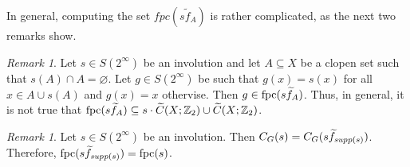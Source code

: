 \documentclass[11pt]{amsart}
\newcommand{\suppg}{{\it supp}}
\newcommand{\fpc}{{\rm fpc}}
\theoremstyle{plain}
\theoremstyle{definition}
\theoremstyle{remark}
\newtheorem{remark}[theorem]{Remark}
\numberwithin{equation}{section}
\begin{document}
In general, computing the set $fpc(s\widetilde f_A)$ is rather complicated, as the next two remarks show.
\begin{remark}\label{rem: fpc s widetilde f_A}
	Let $s\in S(2^\infty)$ be an involution and let $A\subseteq X$ be a clopen set such that $s(A)\cap A=\varnothing$. Let $g\in S(2^\infty)$ be such that $g(x)=s(x)$ for all $x\in A\cup s(A)$ and $g(x)=x$ othervise. Then $g\in\fpc(s\widetilde f_A)$. Thus, in general, it is not true that $\fpc(s\widetilde f_A)\subseteq s\cdot \widetilde C(X;\mathbb Z_2)\cup \widetilde C(X;\mathbb Z_2)$.
\end{remark}
\begin{remark}\label{rem: fpc s widetilde f_supp(s)}
	Let $s\in S(2^\infty)$ be an involution. Then $C_G(s)=C_G(s\widetilde f_{\suppg(s)})$. Therefore, $\fpc(s\widetilde f_{\suppg(s)})=\fpc(s)$.
\end{remark}
\end{document}
